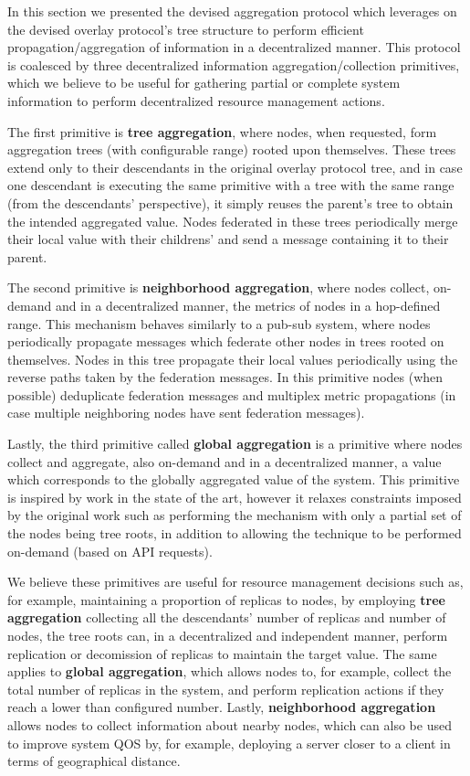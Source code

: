 In this section we presented the devised aggregation protocol which leverages on the devised overlay protocol's tree structure to perform efficient propagation/aggregation of information in a decentralized manner. This protocol is coalesced by three decentralized information aggregation/collection primitives, which we believe to be useful for gathering partial or complete system information to perform decentralized resource management actions. 

The first primitive is \textbf{tree aggregation}, where nodes, when requested, form aggregation trees (with configurable range) rooted upon themselves. These trees extend only to their descendants in the original overlay protocol tree, and in case one descendant is executing the same primitive with a tree with the same range (from the descendants' perspective), it simply reuses the parent's tree to obtain the intended aggregated value. Nodes federated in these trees periodically merge their local value with their childrens' and send a message containing it to their parent.

The second primitive is \textbf{neighborhood aggregation}, where nodes collect, on-demand and in a decentralized manner, the metrics of nodes in a hop-defined range. This mechanism behaves similarly to a pub-sub system, where nodes periodically propagate messages which federate other nodes in trees rooted on themselves. Nodes in this tree propagate their local values periodically using the reverse paths taken by the federation messages. In this primitive nodes (when possible) deduplicate federation messages and multiplex metric propagations (in case multiple neighboring nodes have sent federation messages).

Lastly, the third primitive called \textbf{global aggregation} is a primitive where nodes collect and aggregate, also on-demand and in a decentralized manner, a value which corresponds to the globally aggregated value of the system. This primitive is inspired by work in the state of the art, however it relaxes constraints imposed by the original work such as performing the mechanism with only a partial set of the nodes being tree roots, in addition to allowing the technique to be performed on-demand (based on API requests).

We believe these primitives are useful for resource management decisions such as, for example, maintaining a proportion of replicas to nodes, by employing \textbf{tree aggregation} collecting all the descendants' number of replicas and number of nodes, the tree roots can, in a decentralized and independent manner, perform replication or decomission of replicas to maintain the target value. The same applies to \textbf{global aggregation}, which allows nodes to, for example, collect the total number of replicas in the system, and perform replication actions if they reach a lower than configured number. Lastly, \textbf{neighborhood aggregation} allows nodes to collect information about nearby nodes, which can also be used to improve system QOS by, for example, deploying a server closer to a client in terms of geographical distance.
